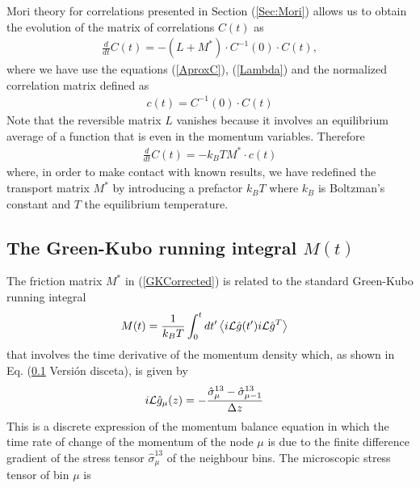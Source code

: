 \documentclass[a4paper,openright,12pt]{book}
\newcommand{\esc}{\!\cdot\!}
\newcommand{\Pendiente}[1]{{\color{green}#1}} %
\newcommand{\llangle}{\left\langle}
\newcommand{\rrangle}{\right\rangle}
\begin{document}
Mori theory for correlations presented in Section (\ref{Sec:Mori}) allows us to obtain the evolution of the matrix of correlations $C(t)$ as
\begin{align}
    \frac{d}{dt}C(t) = -(L+M^*)\cdot C^{-1}(0)\cdot C(t),
\end{align}
where we have use the equations (\ref{AproxC}), (\ref{Lambda}) and the normalized correlation matrix defined as
\begin{align}
  c(t)=C^{-1}(0)\esc C(t)
\end{align}
\Pendiente{Note that the reversible matrix $L$ vanishes because it involves an equilibrium average of a function that is even in the momentum variables}. Therefore
\begin{align}
    \frac{d}{dt}C(t) = -k_BTM^*\cdot c(t)
    \label{AproxCg}
\end{align}
where, in order to make contact  with known results, we have redefined
the transport  matrix $M^*$  by introducing  a prefactor  $k_BT$ where
$k_B$ is Boltzman's constant and $T$ the equilibrium temperature. 

\subsection{The Green-Kubo running integral $M(t)$}
The friction matrix $M^*$ in (\ref{GKCorrected}) is
related to the standard Green-Kubo running integral
\begin{align}
M(t)&=\frac{1}{k_BT}\int_0^{t}dt' \llangle i{\cal L}\hat{g}(t')i{\cal L}\hat{g}^T\rrangle
\label{Mmunu}
\end{align}
that  involves the  time
derivative of the  momentum density which, as shown  in Eq. \Pendiente{(\ref{} Versión disceta)}, is
given by
\begin{align}
  i{\cal L}  \hat{g}_{\mu}(z)&=-\frac{\hat{\sigma}^{13}_{\mu}-\hat{\sigma}^{13}_{\mu-1}}{\Delta z}
\label{iLAcurrentx}
\end{align}
This  is a  discrete expression  of the  momentum balance  equation in
which the time rate of change of the momentum of the node $\mu$ is due
to   the   finite   difference   gradient   of   the   stress   tensor
$\hat{\sigma}^{13}_{\mu}$  of  the  neighbour bins.   The 
microscopic   stress   tensor   of  bin $\mu$ is 
\end{document}
